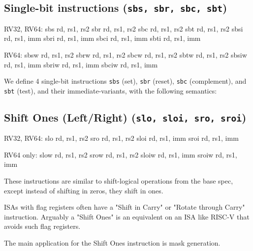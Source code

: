 
\subsection{Single-bit instructions (\texttt{sbs, sbr, sbc, sbt})}

\begin{rvb}
  RV32, RV64:
    sbs  rd, rs1, rs2
    sbr  rd, rs1, rs2
    sbc  rd, rs1, rs2
    sbt  rd, rs1, rs2
    sbsi rd, rs1, imm
    sbri rd, rs1, imm
    sbci rd, rs1, imm
    sbti rd, rs1, imm

  RV64:
    sbsw  rd, rs1, rs2
    sbrw  rd, rs1, rs2
    sbcw  rd, rs1, rs2
    sbtw  rd, rs1, rs2
    sbsiw rd, rs1, imm
    sbriw rd, rs1, imm
    sbciw rd, rs1, imm
\end{rvb}

We define 4 single-bit instructions \texttt{sbs} (set), \texttt{sbr} (reset),
\texttt{sbc} (complement), and \texttt{sbt} (test), and their immediate-variants,
with the following semantics:




\subsection{Shift Ones (Left/Right) (\texttt{slo,\ sloi,\ sro,\ sroi})}

\begin{rvb}
  RV32, RV64:
    slo  rd, rs1, rs2
    sro  rd, rs1, rs2
    sloi rd, rs1, imm
    sroi rd, rs1, imm

  RV64 only:
    slow  rd, rs1, rs2
    srow  rd, rs1, rs2
    sloiw rd, rs1, imm
    sroiw rd, rs1, imm
\end{rvb}

These instructions are similar to shift-logical operations from the base
spec, except instead of shifting in zeros, they shift in ones.



ISAs with flag registers often have a "Shift in Carry" or "Rotate through Carry" instruction.
Arguably a "Shift Ones" is an equivalent on an ISA like RISC-V that avoids such flag registers.

The main application for the Shift Ones instruction is mask generation.

